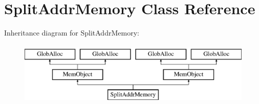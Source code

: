 \hypertarget{classSplitAddrMemory}{\section{Split\-Addr\-Memory Class Reference}
\label{classSplitAddrMemory}
}
Inheritance diagram for Split\-Addr\-Memory\-:\begin{figure}[H]
\begin{center}
\leavevmode
\includegraphics[height=3.000000cm]{classSplitAddrMemory}
\end{center}
\end{figure}
